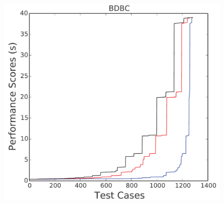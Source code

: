\documentclass[conference]{IEEEtran}
\begin{document}
{\begin{figure}[htbp!]
\begin{minipage}{0.30\linewidth}
\includegraphics[width=\linewidth]{_figs/BDBC.pdf}
\end{minipage}


\end{figure}}
\end{document}
